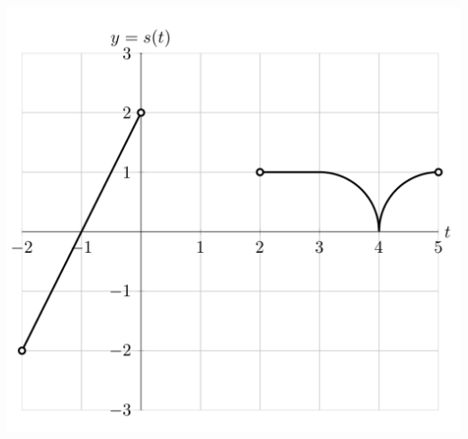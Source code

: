 \documentclass[11pt]{exam}
\begin{document}
\begin{questions}
	\vspace{-1em}
	\begin{multicols}{2}
	\includegraphics[scale=0.39]{graphs}
	

\end{multicols}
\end{questions}
\end{document}
